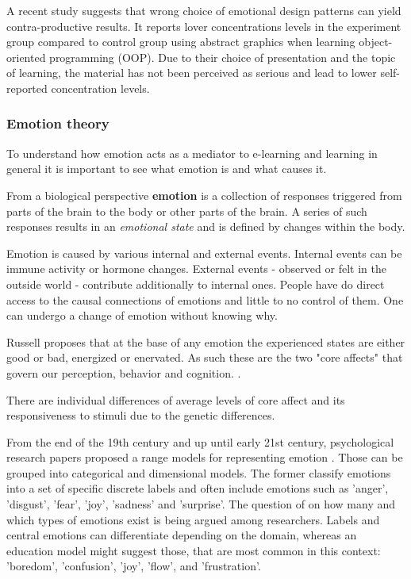 	A recent study \cite{Haaranen2015} suggests that wrong choice of emotional design patterns can yield contra-productive results. It reports lover concentrations levels in the experiment group compared to control group using abstract graphics when learning object-oriented programming (OOP). Due to their choice of presentation and the topic of learning, the material has not been perceived as serious and lead to lower self-reported concentration levels.
		
		\subsubsection{Emotion theory} \label{sec:emotion-theory}
		
		To understand how emotion acts as a mediator to e-learning and learning in general it is important to see what emotion is and what causes it.
		
		From a biological perspective \textbf{emotion} is a collection of responses triggered from parts of the brain to the body or other parts of the brain. A series of such responses results in an \textit{emotional state} and is defined by changes within the body. \cite{Damasio1998}
	
		Emotion is caused by various internal and external events. Internal events can be immune activity or hormone changes. External events - observed or felt in the outside world - contribute additionally to internal ones. People have do direct access to the causal connections of emotions and little to no control of them. One can undergo a change of emotion without knowing why. \cite{Russell2003}
		
		Russell proposes that at the base of any emotion the experienced states are either good or bad, energized or enervated. As such these are the two "core affects" that govern our perception, behavior and cognition. \cite{Russell2003}. 
		
		There are individual differences of average levels of core affect and its responsiveness to stimuli due to the genetic differences. \cite{Russell2003}
		
		From the end of the 19th century and up until early 21st century, psychological research papers proposed a range models for representing emotion . Those can be grouped into categorical and dimensional models. The former classify emotions into a set of specific discrete labels and often include emotions such as 'anger', 'disgust', 'fear', 'joy', 'sadness' and 'surprise'. The question of on how many and which types of emotions exist is being argued among researchers. 
		Labels and central emotions can differentiate depending on the domain, whereas an education model might suggest those, that are most common in this context: 'boredom', 'confusion', 'joy', 'flow', and 'frustration'.
		
